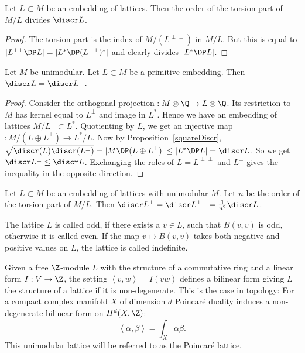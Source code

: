 \begin{proposition}\label{TorsionQuotient} Let $L\subset M$ be an embedding of lattices. Then the order of the torsion part of $M/L$ 
divides $\discr L$.
\end{proposition}
\begin{proof}
The torsion part is the index of $M/( L^{\perp\perp})$ in $M/L$. But this is equal to $|L^{\perp\perp}\DP L| = |L^* \DP (L^{\perp\perp})^*|$ and clearly divides $|L^*\DP L|$.
\end{proof}
\begin{proposition}\label{discrOrthPrim}
Let $M$ be unimodular. Let $L\subset M$ be a primitive embedding. Then $\discr L = \discr L^\perp$.
\end{proposition}
\begin{proof}
Consider the orthogonal projection $ : M\otimes\Q \rightarrow L\otimes \Q$. Its restriction to $M$ has kernel equal to $L^\perp$ and image in $L^*$. Hence we have an embedding of lattices $M/L^\perp \subset L^*$. Quotienting by $L$, we get an injective map $: M/(L\oplus L^\perp) \rightarrow L^*/L$. 
Now by Proposition~\ref{squareDiscr}, $\sqrt{\discr(L) \discr (L^\perp)} =|M \DP (L\oplus L^\perp)| \leq |L^*\DP L| = \discr L$. So we get $\discr L^\perp \leq \discr L$. Exchanging the roles of $L=L^{\perp\perp}$ and $L^\perp$ gives the inequality in the opposite direction.
\end{proof}
\begin{corollary}\label{latticeCor}
Let $L\subset M$ be an embedding of lattices with unimodular $M$. Let $n$ be the order of the torsion part of $M/L$. Then $\discr L^\perp =\discr L^{\perp\perp} = \frac{1}{n^2}\discr L$.
\end{corollary}
The lattice $L$ is called odd, if there exists a $v\in L$, such that $B(v,v)$ is odd, otherwise it is called even. 
If the map $v \mapsto B(v,v)$ takes both negative and positive values on $L$, the lattice is called indefinite. 


\begin{example}
Given a free $\Z$-module $L$ with the structure of a commutative ring and a linear form $I:V\rightarrow \Z$, the setting $\left<v,w\right>=I(vw)$ defines a bilinear form giving $L$ the structure of a lattice if it is non-degenerate. This is the case in topology:
For a compact complex manifold $X$ of dimension $d$ Poincar\'e duality induces a non-degenerate bilinear form on $H^d(X,\Z)$: $$\left<\alpha,\beta\right> = \int_X\alpha\beta.$$ 
This unimodular lattice will be referred to as the Poincar\'e lattice.
\end{example}